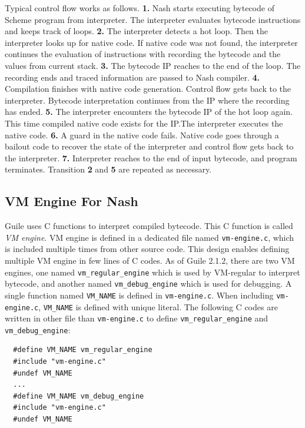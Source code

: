 \documentclass[preprint, 10pt]{sigplanconf}
\begin{document}
Typical control flow works as follows.  \textbf{1.} Nash starts executing
bytecode of Scheme program from interpreter. The interpreter evaluates
bytecode instructions and keeps track of loops. \textbf{2.} The interpreter
detects a hot loop. Then the interpreter looks up for native code. If native
code was not found, the interpreter continues the evaluation of instructions
with recording the bytecode and the values from current stack.  \textbf{3.}
The bytecode IP reaches to the end of the loop. The recording ends and traced
information are passed to Nash compiler. \textbf{4.} Compilation finishes with
native code generation. Control flow gets back to the interpreter. Bytecode
interpretation continues from the IP where the recording has
ended. \textbf{5.} The interpreter encounters the bytecode IP of the hot loop
again. This time compiled native code exists for the IP.\@ The interpreter
executes the native code.  \textbf{6.} A guard in the native code
fails. Native code goes through a bailout code to recover the state of the
interpreter and control flow gets back to the interpreter. \textbf{7.}
Interpreter reaches to the end of input bytecode, and program terminates.
Transition \textbf{2} and \textbf{5} are repeated as necessary.

\subsection{VM Engine For Nash}

Guile uses C functions to interpret compiled bytecode. This C function is
called \textit{VM engine}. VM engine is defined in a dedicated file named
\texttt{vm-engine.c}, which is included multiple times from other source
code. This design enables defining multiple VM engine in few lines of C
codes. As of Guile 2.1.2, there are two VM engines, one named
\texttt{vm\_regular\_engine} which is used by VM-regular to interpret
bytecode, and another named \texttt{vm\_debug\_engine} which is used for
debugging. A single function named \texttt{VM\_NAME} is defined in
\texttt{vm-engine.c}.  When including \texttt{vm-engine.c}, \texttt{VM\_NAME}
is defined with unique literal. The following C codes are written in other
file than \texttt{vm-engine.c} to define \texttt{vm\_regular\_engine} and
\texttt{vm\_debug\_engine}:

\begin{verbatim}
  #define VM_NAME vm_regular_engine
  #include "vm-engine.c"
  #undef VM_NAME
  ...
  #define VM_NAME vm_debug_engine
  #include "vm-engine.c"
  #undef VM_NAME
\end{verbatim}
\end{document}
